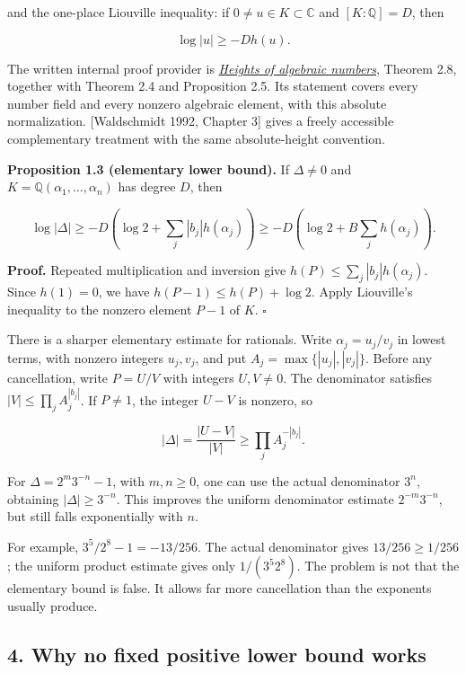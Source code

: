 \documentclass[
  11pt,
  a4paper,
]{article}
\begin{document}
and the one-place Liouville inequality: if
\(0\ne u\in K\subset\mathbb C\) and \([K:\mathbb Q]=D\), then

\[
\log|u|\ge-Dh(u).
\]

The written internal proof provider is
\href{https://kokunoyumeto.github.io/open-math-courses-public/courses/TR-TRANS/TR-TRANS-02.html}{\emph{Heights of algebraic
numbers}}, Theorem 2.8, together with Theorem 2.4 and Proposition 2.5.
Its statement covers every number field and every nonzero algebraic
element, with this absolute normalization. {[}Waldschmidt 1992, Chapter
3{]} gives a freely accessible complementary treatment with the same
absolute-height convention.

\textbf{Proposition 1.3 (elementary lower bound).} If \(\Delta\ne0\) and
\(K=\mathbb Q(\alpha_1,\ldots,\alpha_n)\) has degree \(D\), then

\[
\log|\Delta|\ge-D\left(\log2+\sum_j|b_j|h(\alpha_j)\right)
\ge-D\left(\log2+B\sum_jh(\alpha_j)\right).
\]

\textbf{Proof.} Repeated multiplication and inversion give
\(h(P)\le\sum_j|b_j|h(\alpha_j)\). Since \(h(1)=0\), we have
\(h(P-1)\le h(P)+\log2\). Apply Liouville's inequality to the nonzero
element \(P-1\) of \(K\). \(\square\)

There is a sharper elementary estimate for rationals. Write
\(\alpha_j=u_j/v_j\) in lowest terms, with nonzero integers \(u_j,v_j\),
and put \(A_j=\max\{|u_j|,|v_j|\}\). Before any cancellation, write
\(P=U/V\) with integers \(U,V\ne0\). The denominator satisfies
\(|V|\le\prod_j A_j^{|b_j|}\). If \(P\ne1\), the integer \(U-V\) is
nonzero, so

\[
|\Delta|=\frac{|U-V|}{|V|}\ge\prod_jA_j^{-|b_j|}.
\]

For \(\Delta=2^m3^{-n}-1\), with \(m,n\ge0\), one can use the actual
denominator \(3^n\), obtaining \(|\Delta|\ge3^{-n}\). This improves the
uniform denominator estimate \(2^{-m}3^{-n}\), but still falls
exponentially with \(n\).

For example, \(3^5/2^8-1=-13/256\). The actual denominator gives
\(13/256\ge1/256\); the uniform product estimate gives only
\(1/(3^5 2^8)\). The problem is not that the elementary bound is false.
It allows far more cancellation than the exponents usually produce.

\subsection{4. Why no fixed positive lower bound
works}\label{why-no-fixed-positive-lower-bound-works}
\end{document}
